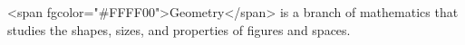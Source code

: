 \documentclass[preview]{standalone}
\begin{document}
\begin{center}
<span fgcolor="#FFFF00">Geometry</span> is a branch of mathematics that studies the shapes, sizes, and properties of figures and spaces.
\end{center}
\end{document}
